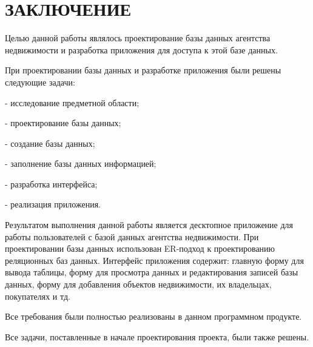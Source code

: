 \section*{ЗАКЛЮЧЕНИЕ}
Целью данной работы являлось проектирование базы данных агентства недвижимости и разработка приложения для доступа к этой базе данных.

При проектировании базы данных и разработке приложения были решены следующие задачи:

-  исследование предметной области;

-  проектирование базы данных;

-  создание базы данных;

-  заполнение базы данных информацией;

-  разработка интерфейса;

-  реализация приложения.

Результатом выполнения данной работы является десктопное приложение для работы пользователей с базой данных агентства недвижимости. При проектировании базы данных использован ER-подход к проектированию реляционных баз данных. Интерфейс приложения содержит: главную форму для вывода таблицы, форму для просмотра данных и редактирования записей базы данных, форму для добавления объектов недвижимости, их владельцах, покупателях и тд.

Все требования были полностью реализованы в данном программном продукте.

Все задачи, поставленные в начале проектирования проекта, были также решены.